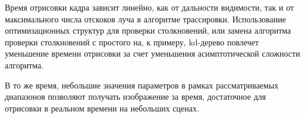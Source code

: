 Время отрисовки кадра зависит линейно, как от дальности видимости, так и от
максимального числа отскоков луча в алгоритме трассировки. Использование 
оптимизационных структур для проверки столкновений, или замена алгоритма 
проверки столкновений с простого на, к примеру, kd-дерево повлечет 
уменьшение времени отрисовки за счет уменьшения асимптотической сложности 
алгоритма.

В то же время, небольшие значения параметров в рамках рассматриваемых диапазонов
позволяют получать изображение за время, достаточное для отрисовки в реальном времени на 
небольших сценах.



